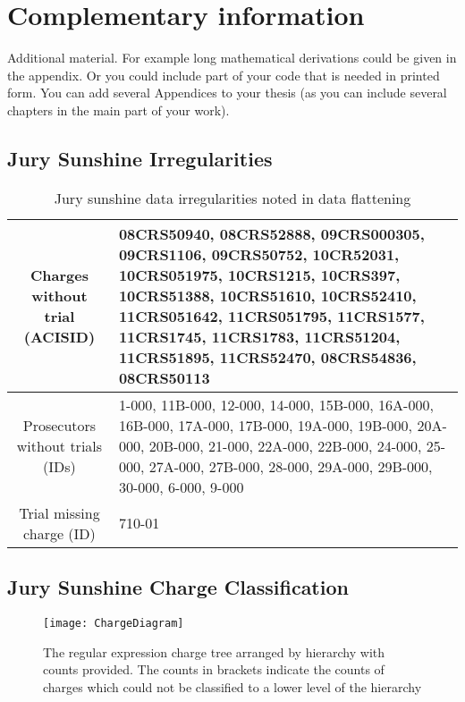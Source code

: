 \chapter{Complementary information}
\label{app:complement}

Additional material. For example long mathematical derivations could be
given in the appendix. Or you could include part of your code that is
needed in printed form. You can add several Appendices to your thesis (as
you can include several chapters in the main part of your work).

\section{Jury Sunshine Irregularities} \label{app:irregs}

\begin{table}[h]
  \caption[Jury Sunshine Irregularities]{Jury sunshine data irregularities noted in data flattening}
  \centering
  \begin{tabularx}{\textwidth}{|c|X|} \hline
    Charges without trial (ACISID) & 08CRS50940, 08CRS52888, 09CRS000305, 09CRS1106, 09CRS50752, 10CR52031, 10CRS051975,
    10CRS1215, 10CRS397, 10CRS51388, 10CRS51610, 10CRS52410, 11CRS051642, 11CRS051795, 11CRS1577, 11CRS1745, 11CRS1783,
    11CRS51204, 11CRS51895, 11CRS52470, 08CRS54836, 08CRS50113 \\ \hline 
    Prosecutors without trials (IDs) & 1-000, 11B-000, 12-000, 14-000, 15B-000, 16A-000,
                     16B-000, 17A-000, 17B-000, 19A-000, 19B-000,
                     20A-000, 20B-000, 21-000, 22A-000, 22B-000,
                     24-000, 25-000, 27A-000, 27B-000, 28-000,
                                       29A-000, 29B-000, 30-000, 6-000, 9-000 \\ \hline
    Trial missing charge (ID) & 710-01 \\ \hline
  \end{tabularx}
\end{table}

\section{Jury Sunshine Charge Classification} \label{app:charge}

\begin{figure}[!h]
  \centering
  \texttt{[image: ChargeDiagram]}
  \caption[Regular expression charge tree visualized]{The regular expression charge tree arranged by hierarchy with counts
    provided. The counts in brackets indicate the counts of charges which could not be classified to a lower level of the
    hierarchy}
  \label{fig:chargetree}
\end{figure}

